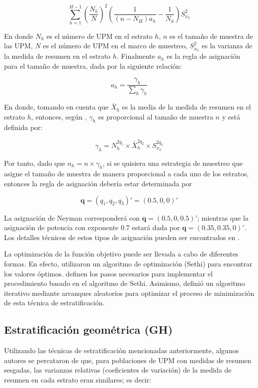 \documentclass[
  12pt,
]{book}
\begin{document}
\[
\sum_{h=1}^{H-1} \left(\frac{N_h}{N}\right)^2\left(\frac{1}{(n-N_H)a_h}-\frac{1}{N_h}\right) S^2_{x_h}
\]

En donde \(N_h\) es el número de UPM en el estrato \(h\), \(n\) es el tamaño de muestra de las UPM, \(N\) es el número de UPM en el marco de muestreo, \(S^2_{x_h}\) es la varianza de la medida de resumen en el estrato \(h\). Finalmente \(a_h\) es la regla de asignación para el tamaño de muestra, dada por la siguiente relación:

\[
a_h = \frac{\gamma_h}{\sum_h \gamma_h}
\]

En donde, tomando en cuenta que \(\bar{X}_h\) es la media de la medida de resumen en el estrato \(h\), entonces, según \citep{Baillargeon_Rivest_2011}, \(\gamma_h\) es proporcional al tamaño de muestra \(n\) y está definida por:

\[
\gamma_h = N_h^{2q_1} \times  \bar{X}_h^{2q_2} \times S^{2q_3}_{x_h}
\]

Por tanto, dado que \(n_h = n \times \gamma_h\), si se quisiera una estrategia de muestreo que asigne el tamaño de muestra de manera proporcional a cada uno de los estratos, entonces la regla de asignación debería estar determinada por

\[
\mathbf q = (q_1, q_2, q_3)' = (0.5, 0, 0)'
\]

La asignación de Neyman corresponderá con \(\mathbf q = (0.5, 0, 0.5)'\); mientras que la asignación de potencia con exponente 0.7 estará dada por \(\mathbf q = (0.35, 0.35, 0)'\). Los detalles técnicos de estos tipos de asignación pueden ser encontrados en \citet{Gutierrez_2016}.

La optimización de la función objetivo puede ser llevada a cabo de diferentes formas. En efecto, \citet{Lavallee_Hidiroglou_1988} utilizaron un algoritmo de optimización (Sethi) para encontrar los valores óptimos. \citet{Baillargeon_Rivest_Ferland_2007} definen los pasos necesarios para implementar el procedimiento basado en el algoritmo de Sethi. Asimismo, \citet{Kozak_2004} definió un algoritmo iterativo mediante arranques aleatorios para optimizar el proceso de minimización de esta técnica de estratificación.

\hypertarget{estratificaciuxf3n-geomuxe9trica-gh}{%
\subsection{Estratificación geométrica (GH)}\label{estratificaciuxf3n-geomuxe9trica-gh}}

Utilizando las técnicas de estratificación mencionadas anteriormente, algunos autores se percataron de que, para poblaciones de UPM con medidas de resumen sesgadas, las varianzas relativas (coeficientes de variación) de la medida de resumen en cada estrato eran similares; es decir:
\end{document}

